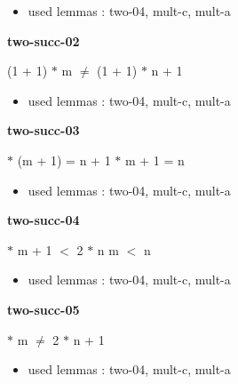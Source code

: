\documentclass[a4paper]{article}
\begin{document}
\begin{itemize}


\item       used lemmas  : two-04, mult-c, mult-a

\end{itemize}

\medskip

\bigskip

{\large\bf two-succ-02}

\medskip

 \Fol (1 + 1) $*$ m $\neq$ (1 + 1) $*$ n + 1

\begin{itemize}


\item       used lemmas  : two-04, mult-c, mult-a

\end{itemize}

\medskip

\bigskip

{\large\bf two-succ-03}

\medskip

  $*$ (m + 1) = n + 1  $*$ m + 1 = n

\begin{itemize}


\item       used lemmas  : two-04, mult-c, mult-a

\end{itemize}

\medskip

\bigskip

{\large\bf two-succ-04}

\medskip

  $*$ m + 1 $<$ 2 $*$ n \Equiv m $<$ n

\begin{itemize}


\item       used lemmas  : two-04, mult-c, mult-a

\end{itemize}

\medskip

\bigskip

{\large\bf two-succ-05}

\medskip

  $*$ m $\neq$ 2 $*$ n + 1

\begin{itemize}


\item       used lemmas  : two-04, mult-c, mult-a

\end{itemize}
\end{document}
